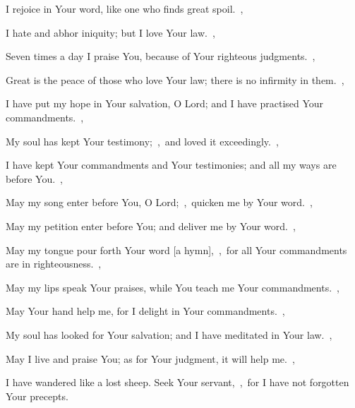 \documentclass[12pt,twoside,a5paper]{article}
\begin{document}
\begin{normalparskip}

  I rejoice in Your word, like one who finds great spoil.~\sep

  I hate and abhor iniquity; but I love Your law.~\sep

  Seven times a day I praise You, because of Your righteous judgments.~\sep

  Great is the peace of those who love Your law; there is no infirmity in them.~\sep

  I have put my hope in Your salvation, O Lord; and I have practised Your commandments.~\sep

  My soul has kept Your testimony;~\sep\ and loved it exceedingly.~\sep

  I have kept Your commandments and Your testimonies; and all my ways are before You.~\sep

   May my song enter before You, O Lord;~\sep\ quicken me by Your word.~\sep


  May my petition enter before You; and deliver me by Your word.~\sep

  May my tongue pour forth Your word [a hymn],~\sep\ for all Your commandments are in righteousness.~\sep

  May my lips speak Your praises, while You teach me Your commandments.~\sep

  May Your hand help me, for I delight in Your commandments.~\sep

  My soul has looked for Your salvation; and I have meditated in Your law.~\sep

  May I live and praise You; as for Your judgment, it will help me.~\sep

  I have wandered like a lost sheep. Seek Your servant,~\sep\ for I have not forgotten Your precepts.
\end{normalparskip}



\end{document}

